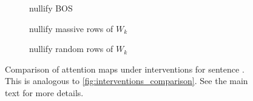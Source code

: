\documentclass[11pt]{article}
\newif\ifYRMcomments
\newcommand{\YRM}[1]{\ifYRMcomments\textcolor{red}{[YRM: #1]}\fi}
\begin{document}
\begin{figure}[t!]
   \begin{subfigure}[t]{0.22\textwidth}
     \centering
     \caption{nullify BOS}
     \label{fig:more_intervention4_s1}
   \end{subfigure}\hspace{\bottomsep}
   \begin{subfigure}[t]{0.22\textwidth}
     \centering
     \caption{nullify massive rows of $W_k$}
     \label{fig:more_intervention5_s1}
   \end{subfigure}\hspace{\bottomsep}
   \begin{subfigure}[t]{0.22\textwidth}
     \centering
     \caption{nullify random rows of $W_k$}
     \label{fig:more_intervention5_2_s1}
   \end{subfigure}
   \caption{Comparison of attention maps under interventions for sentence \YRM{add sentence number 1 here}. This is analogous to \cref{fig:interventions_comparison}. See the main text for more details.}
   \label{fig:more_interventions_s1}
 \end{figure}
\clearpage
\end{document}
